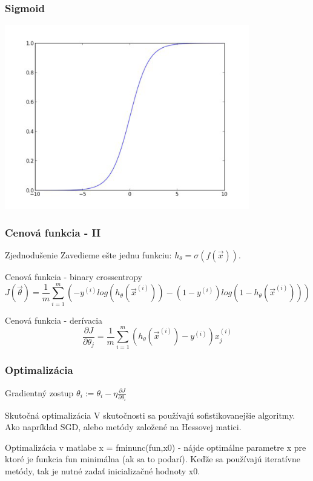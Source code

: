 \documentclass{beamer}
\begin{document}
\begin{frame}
\frametitle{Sigmoid}
\center
\includegraphics[width=0.8\textwidth]{sigmoid.png}
\end{frame}



\begin{frame}
\frametitle{Cenová funkcia - II}
\begin{block}{Zjednodušenie}
Zavedieme ešte jednu funkciu: $h_{\theta} = \sigma(f(\vec{x}))$.
\end{block}

\begin{block}{Cenová funkcia - binary crossentropy}
\begin{equation*}
J(\vec{\theta}) = \frac{1}{m} \sum_{i=1}^m \left( -y^{(i)} log(h_{\theta}(\vec{x}^{(i)})) - (1 - y^{(i)}) log(1 - h_{\theta} (\vec{x}^{(i)})) \right)
\end{equation*}
\end{block}

\begin{block}{Cenová funkcia - derívacia}
\begin{equation*}
\frac{\partial J}{\partial \theta_j} = \frac{1}{m} \sum_{i=1}^m \left( h_{\theta}(\vec{x}^{(i)}) - y^{(i)} \right) x_j^{(i)}
\end{equation*}
\end{block}
\end{frame}


\begin{frame}
\frametitle{Optimalizácia}
\begin{block}{Gradientný zostup}
$\theta_i := \theta_i - \eta \frac{\partial J}{\partial \theta_i}$
\end{block}

\begin{block}{Skutočná optimalizácia}
V skutočnosti sa používajú sofistikovanejšie algoritmy. Ako napríklad SGD, alebo metódy založené na Hessovej matici.
\end{block}

\begin{block}{Optimalizácia v matlabe}
x = fminunc(fun,x0) - nájde optimálne parametre x pre ktoré je funkcia fun minimálna (ak sa to podarí). Keďže sa používajú iteratívne metódy, tak je nutné zadať inicializačné hodnoty x0.
\end{block}
\end{frame}
\end{document}
